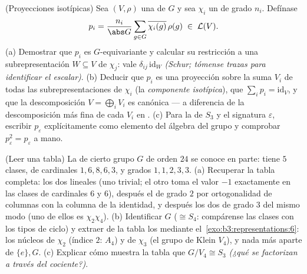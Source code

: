 \begin{exercise}[$\star\star$]\label{exo:b3:representations:11}
(Proyecciones isotípicas) Sea $(V, \rho)$ una
 de $G$ y sea
$\chi_i$ un 
 de grado $n_i$.
Defínase
\[
p_i = \frac{n_i}{\abs G}\sum_{g\in G}
\overline{\chi_i(g)}\,\rho(g) \;\in\; \mathcal L(V).
\]
(a) Demostrar que $p_i$ es $G$-equivariante y calcular su restricción a
una subrepresentación 
$W \subseteq
V$ de  $\chi_j$: vale
$\delta_{ij}\,
\mathrm{id}_W$ \emph{(Schur; tómense trazas para identificar el
escalar)}. (b) Deducir que $p_i$ es una proyección sobre la suma $V_i$
de todas las subrepresentaciones
 de
 $\chi_i$ (la
\emph{componente isotípica}), que $\sum_ip_i =
\mathrm{id}_V$, y que la descomposición $V =
\bigoplus_iV_i$ es canónica --- a diferencia de la descomposición más
fina de cada $V_i$ en .
(c) Para la  de $S_3$ y el
 signatura
$\varepsilon$, escribir $p_\varepsilon$ explícitamente como elemento del
álgebra del grupo y comprobar $p_\varepsilon^2
= p_\varepsilon$ a mano.
\end{exercise}

\begin{exercise}[$\star\star$]\label{exo:b3:representations:12}
(Leer una tabla) La  de cierto grupo $G$ de orden $24$ se conoce en parte: tiene
$5$ clases, de cardinales $1, 6, 8, 6, 3$, y grados $1, 1, 2, 3, 3$. (a)
Recuperar la tabla completa: los dos
 lineales (uno
trivial; el otro toma el valor $-1$ exactamente en las clases de
cardinales $6$ y $6$), después el
 de grado $2$ por
ortogonalidad de columnas con la columna de la identidad, y después los
dos  de grado $3$
del mismo modo (uno de ellos es $\chi_2\chi_4$). (b) Identificar $G$
($\cong S_4$: compárense las clases con los tipos de ciclo) y extraer de
la tabla los  mediante
el~\cref{exo:b3:representations:6}: los núcleos de $\chi_2$ (índice $2$:
$A_4$) y de $\chi_3$ (el grupo de Klein $V_4$), y nada más aparte de
$\{e\}, G$. (c) Explicar cómo muestra la tabla que $G/V_4 \cong S_3$
\emph{(¿qué  se
factorizan a través del cociente?)}.
\end{exercise}

